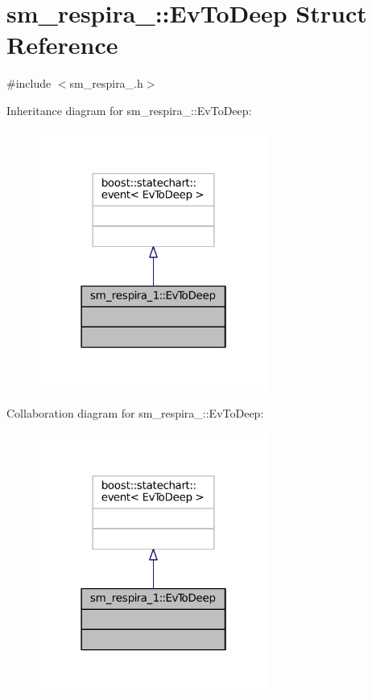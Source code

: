 \hypertarget{structsm__respira__1_1_1EvToDeep}{}\section{sm\+\_\+respira\+\_\+:\+:Ev\+To\+Deep Struct Reference}
\label{structsm__respira__1_1_1EvToDeep}


{\ttfamily \#include $<$sm\+\_\+respira\+\_.\+h$>$}



Inheritance diagram for sm\+\_\+respira\+\_\+:\+:Ev\+To\+Deep\+:
\nopagebreak
\begin{figure}[H]
\begin{center}
\leavevmode
\includegraphics[width=214pt]{structsm__respira__1_1_1EvToDeep__inherit__graph}
\end{center}
\end{figure}


Collaboration diagram for sm\+\_\+respira\+\_\+:\+:Ev\+To\+Deep\+:
\nopagebreak
\begin{figure}[H]
\begin{center}
\leavevmode
\includegraphics[width=214pt]{structsm__respira__1_1_1EvToDeep__coll__graph}
\end{center}
\end{figure}


